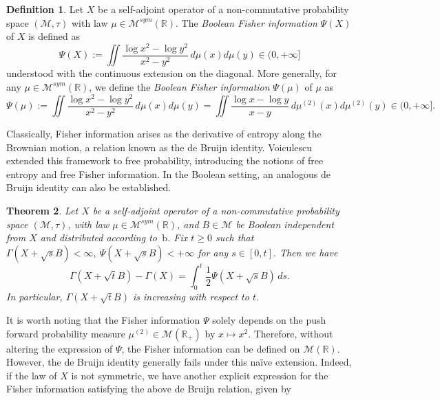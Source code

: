 \documentclass[10pt, reqno]{amsart}
\numberwithin{equation}{section}
\theoremstyle{definition}
\newtheorem{definition}{Definition}[section]
\theoremstyle{plain}
\newtheorem{theorem}[definition]{Theorem}
\theoremstyle{remark}
\newcommand{\R}{\mathbb{R}}
\newcommand{\1}{\mathbbm{1}}
\newcommand{\probmr}{\mathcal{M}(\R)}
\begin{document}
\begin{definition}
Let $X$ be a self-adjoint operator of a non-commutative probability space $(\mathcal{M},\tau)$ with law $\mu\in\mathcal{M}^{sym}(\R)$. The \textit{Boolean Fisher information} $\Psi(X)$ of $X$ is defined as
\begin{equation}\label{def:fisher}
	\Psi(X):=\iint \frac{\log x^2-\log y^2}{x^2-y^2} \,d\mu(x)d\mu(y)\in (0,+\infty]
\end{equation}
understood with the continuous extension on the diagonal.
More generally, for any $\mu \in\mathcal{M}^{sym}(\R)$, we define the \textit{Boolean Fisher information} $\Psi(\mu)$ of $\mu$ as
\begin{equation*}
    \Psi(\mu):=\iint \frac{\log x^2-\log y^2}{x^2-y^2} \,d\mu(x)d\mu(y) = \iint \frac{\log x-\log y}{x-y} \,d\mu^{(2)}(x)d\mu^{(2)}(y)\in (0,+\infty].
\end{equation*}
\end{definition}
    Classically, Fisher information arises as the derivative of entropy along the Brownian motion, a relation known as the de Bruijn identity. Voiculescu~\cite{voiculescu1993analogues} extended this framework to free probability, introducing the notions of free entropy and free Fisher information. In the Boolean setting, an analogous de Bruijn identity can also be established.
	\begin{theorem}\label{thm:de bruijn}
    Let $X$ be a self-adjoint operator of a non-commutative probability space $(\mathcal{M},\tau)$, with law $\mu\in\mathcal{M}^{sym}(\R)$,  and $B\in \mathcal{M}$ be Boolean independent from $X$ and distributed according to~$\mathrm{b}$. Fix $t\geq 0$ such that $\Gamma(X+\sqrt{s}B)<\infty,\ \Psi(X+\sqrt{s}B)<+\infty$ for any $s\in[0,t].$ Then we have
	\begin{equation}\label{eq:de bruijn}
		\Gamma(X+\sqrt{t}B) - \Gamma(X) = \int_0^t \frac{1}{2}\Psi(X + \sqrt{s}B )\,ds.
	\end{equation}
    In particular, $\Gamma(X+\sqrt{t}B)$ is increasing with respect to $t$.
	\end{theorem}
    It is worth noting that the Fisher information $\Psi$ solely depends on the push forward probability measure $\mu^{(2)}\in\mathcal{M}(\R_+)$ by $x\mapsto x^2$. Therefore, without altering the expression of $\Psi$, the Fisher information can be defined on $\probmr$. However, the de Bruijn identity generally fails under this naïve extension. Indeed, if the law of $X$ is not symmetric, we have another explicit expression for the Fisher information satisfying the above de Bruijn relation, given by
\end{document}
